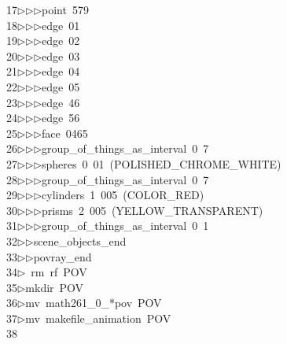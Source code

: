 \begin{tabbing}
17\>$\triangleright$\>$\triangleright$\>$\triangleright$\>point\ 579\ \\[0pt]
18\>$\triangleright$\>$\triangleright$\>$\triangleright$\>edge\ 01\ \\[0pt]
19\>$\triangleright$\>$\triangleright$\>$\triangleright$\>edge\ 02\ \\[0pt]
20\>$\triangleright$\>$\triangleright$\>$\triangleright$\>edge\ 03\ \\[0pt]
21\>$\triangleright$\>$\triangleright$\>$\triangleright$\>edge\ 04\ \\[0pt]
22\>$\triangleright$\>$\triangleright$\>$\triangleright$\>edge\ 05\ \\[0pt]
23\>$\triangleright$\>$\triangleright$\>$\triangleright$\>edge\ 46\ \\[0pt]
24\>$\triangleright$\>$\triangleright$\>$\triangleright$\>edge\ 56\ \\[0pt]
25\>$\triangleright$\>$\triangleright$\>$\triangleright$\>face\ 0465\ \\[0pt]
26\>$\triangleright$\>$\triangleright$\>$\triangleright$\>group\_of\_things\_as\_interval\ 0\ 7\ \\[0pt]
27\>$\triangleright$\>$\triangleright$\>$\triangleright$\>spheres\ 0\ 01\ (POLISHED\_CHROME\_WHITE)\ \\[0pt]
28\>$\triangleright$\>$\triangleright$\>$\triangleright$\>group\_of\_things\_as\_interval\ 0\ 7\ \\[0pt]
29\>$\triangleright$\>$\triangleright$\>$\triangleright$\>cylinders\ 1\ 005\ (COLOR\_RED)\ \\[0pt]
30\>$\triangleright$\>$\triangleright$\>$\triangleright$\>prisms\ 2\ 005\ (YELLOW\_TRANSPARENT)\ \\[0pt]
31\>$\triangleright$\>$\triangleright$\>$\triangleright$\>group\_of\_things\_as\_interval\ 0\ 1\ \\[0pt]
32\>$\triangleright$\>$\triangleright$\>scene\_objects\_end\ \\[0pt]
33\>$\triangleright$\>$\triangleright$\>povray\_end\\[0pt]
34\>$\triangleright$\>\ rm\ rf\ POV\\[0pt]
35\>$\triangleright$\>mkdir\ POV\\[0pt]
36\>$\triangleright$\>mv\ math261\_0\_*pov\ POV\\[0pt]
37\>$\triangleright$\>mv\ makefile\_animation\ POV\\[0pt]
38\>\end{tabbing}
